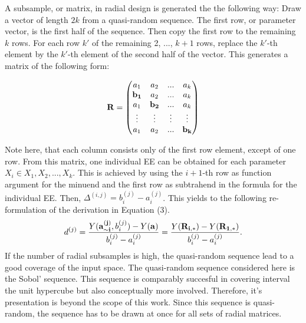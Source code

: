 \documentclass[a4paper,12pt]{article}
\begin{document}
\noindent
A subsample, or matrix, in radial design is generated the the following way: Draw a vector of length $2k$ from a quasi-random sequence. The first row, or parameter vector, is the first half of the sequence. Then copy the first row to the remaining $k$ rows. For each row $k'$ of the remaining 2, ..., $k+1$ rows, replace the $k'$-th element by the $k'$-th element of the second half of the vector. This generates a matrix of the following form:

$$ \bold{R} =
\begin{pmatrix}
a_1 & a_2 & ... & a_k \\
\bold{b_1} & a_2 & ... & a_k \\
a_1 & \bold{b_2} & ... & a_k \\
\vdots & \vdots & \vdots & \vdots\\

a_1 & a_2 & ... & \bold{b_k}
\end{pmatrix}
$$

\noindent
Note here, that each column consists only of the first row element, except of one row.
From this matrix, one individual EE can be obtained for each parameter $X_i \in X_1, X_2, ..., X_k$. This is achieved by using the $i+1$-th row as function argument for the minuend and the first row as subtrahend in the formula for the individual EE. Then, $\Delta^{(i,j)} = b_i^{(j)} - a_i^{(j)}$. This yields to the following re-formulation of the derivation in Equation (3).
\begin{align}
d^{(j)} =  \frac{Y(\bold{a_{\sim i}^{(j)}}, b_i^{(j)}) - Y(\bold{a})}{b_i^{(j)} - a_i^{(j)}} = \frac{Y(\bold{R_{i,*}}) -  Y(\bold{R_{1,*}})}{b_i^{(j)} - a_i^{(j)}}.
\end{align}
If the number of radial subsamples is high, the quasi-random sequence lead to a good coverage of the input space. The quasi-random sequence considered here is the Sobol' sequence. This sequence is comparably succesful in covering interval the unit hypercube but also conceptually more involved. Therefore, it's presentation is beyond the scope of this work. Since this sequence is quasi-random, the sequence has to be drawn at once for all sets of radial matrices.\\
\end{document}

